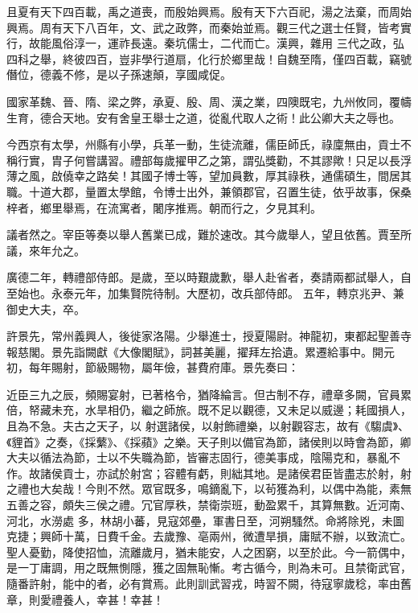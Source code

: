 \begin{pinyinscope}
 且夏有天下四百載，禹之道喪，而殷始興焉。殷有天下六百祀，湯之法棄，而周始興焉。周有天下八百年，文、武之政弊，而秦始並焉。觀三代之選士任賢，皆考實行，故能風俗淳一，運祚長遠。秦坑儒士，二代而亡。漢興，雜用
 三代之政，弘四科之舉，終彼四百，豈非學行道扇，化行於鄉里哉！自魏至隋，僅四百載，竊號僭位，德義不修，是以子孫速顛，享國咸促。



 國家革魏、晉、隋、梁之弊，承夏、殷、周、漢之業，四隩既宅，九州攸同，覆幬生育，德合天地。安有舍皇王舉士之道，從亂代取人之術！此公卿大夫之辱也。



 今西京有太學，州縣有小學，兵革一動，生徒流離，儒臣師氏，祿廩無由，貢士不稱行實，胄子何嘗講習。禮部每歲擢甲乙之第，謂弘獎勸，不其謬歟！只足以長浮
 薄之風，啟僥幸之路矣！其國子博士等，望加員數，厚其祿秩，通儒碩生，間居其職。十道大郡，量置太學館，令博士出外，兼領郡官，召置生徒，依乎故事，保桑梓者，鄉里舉焉，在流寓者，闍序推焉。朝而行之，夕見其利。



 議者然之。宰臣等奏以舉人舊業已成，難於速改。其今歲舉人，望且依舊。賈至所議，來年允之。



 廣德二年，轉禮部侍郎。是歲，至以時艱歲歉，舉人赴省者，奏請兩都試舉人，自至始也。永泰元年，加集賢院待制。大歷初，改兵部侍郎。
 五年，轉京兆尹、兼御史大夫，卒。



 許景先，常州義興人，後徙家洛陽。少舉進士，授夏陽尉。神龍初，東都起聖善寺報慈閣。景先詣闕獻《大像閣賦》，詞甚美麗，擢拜左拾遺。累遷給事中。開元初，每年賜射，節級賜物，屬年儉，甚費府庫。景先奏曰：



 近臣三九之辰，頻賜宴射，已著格令，猶降綸言。但古制不存，禮章多闕，官員累倍，帑藏未充，水旱相仍，繼之師旅。既不足以觀德，又未足以威邊；耗國損人，且為不急。夫古之天子，以
 射選諸侯，以射飾禮樂，以射觀容志，故有《騶虞》、《貍首》之奏，《採蘩》、《採蘋》之樂。天子則以備官為節，諸侯則以時會為節，卿大夫以循法為節，士以不失職為節，皆審志固行，德美事成，陰陽克和，暴亂不作。故諸侯貢士，亦試於射宮；容體有虧，則絀其地。是諸侯君臣皆盡志於射，射之禮也大矣哉！今則不然。眾官既多，鳴鏑亂下，以茍獲為利，以偶中為能，素無五善之容，頗失三侯之禮。冗官厚秩，禁衛崇班，動盈累千，其算無數。近河南、河北，水澇處
 多，林胡小蕃，見寇郊壘，軍書日至，河朔騷然。命將除兇，未圖克捷；興師十萬，日費千金。去歲豫、亳兩州，微遭旱損，庸賦不辦，以致流亡。聖人憂勤，降使招恤，流離歲月，猶未能安，人之困窮，以至於此。今一箭偶中，是一丁庸調，用之既無惻隱，獲之固無恥慚。考古循今，則為未可。且禁衛武官，隨番許射，能中的者，必有賞焉。此則訓武習戎，時習不闕，待寇寧歲稔，率由舊章，則愛禮養人，幸甚！幸甚！




\end{pinyinscope}
